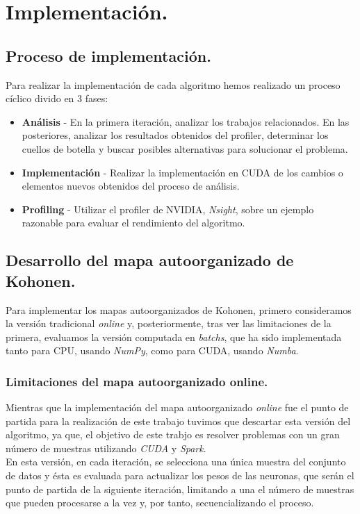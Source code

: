 \chapter{Implementación.}

\section{Proceso de implementación.}
Para realizar la implementación de cada algoritmo hemos realizado un proceso cíclico divido en 3 fases:

\begin{itemize}
	\item \textbf{Análisis} - En la primera iteración, analizar los trabajos relacionados. En las posteriores, analizar los resultados obtenidos del profiler, determinar los cuellos de botella y buscar posibles alternativas para solucionar el problema.
	\item \textbf{Implementación} - Realizar la implementación en CUDA de los cambios o elementos nuevos obtenidos del proceso de análisis.
	\item \textbf{Profiling} - Utilizar el profiler de NVIDIA, \textit{Nsight}, sobre un ejemplo razonable para evaluar el rendimiento del algoritmo.
\end{itemize}

\section{Desarrollo del mapa autoorganizado de Kohonen.}
Para implementar los mapas autoorganizados de Kohonen, primero consideramos la versión tradicional \textit{online} y, posteriormente, tras ver las limitaciones de la primera, evaluamos la versión computada en \textit{batchs}, que ha sido implementada tanto para CPU, usando \textit{NumPy}, como para CUDA, usando \textit{Numba}.

\subsection{Limitaciones del mapa autoorganizado online.}
Mientras que la implementación del mapa autoorganizado \textit{online} fue el punto de partida para la realización de este trabajo tuvimos que descartar esta versión del algoritmo, ya que, el objetivo de este trabjo es resolver problemas con un gran número de muestras utilizando \textit{CUDA} y \textit{Spark}.\\

En esta versión, en cada iteración, se selecciona una única muestra del conjunto de datos y ésta es evaluada para actualizar los pesos de las neuronas, que serán el punto de partida de la siguiente iteración, limitando a una el número de muestras que pueden procesarse a la vez y, por tanto, secuencializando el proceso.\\

